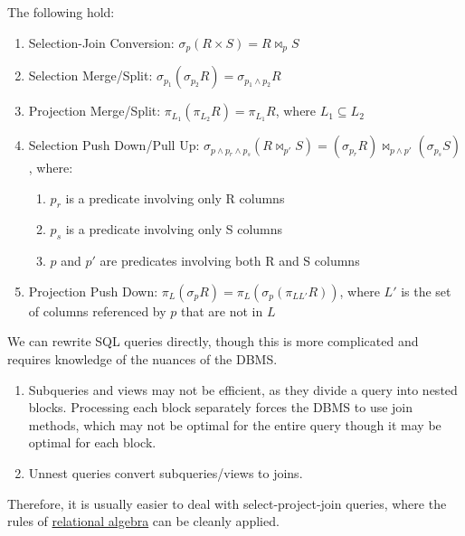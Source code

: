     \begin{theorem}[Identities]
      \label{thm:identities}
      The following hold:
      \begin{enumerate}
        \item Selection-Join Conversion: $\sigma_p(R \times S) = R \bowtie_p S$
        \item Selection Merge/Split: $\sigma_{p_1}(\sigma_{p_2}R) = \sigma_{p_1 \wedge p_2}R$
        \item Projection Merge/Split: $\pi_{L_1}(\pi_{L_2}R) = \pi_{L_1}R$, where $L_1 \subseteq L_2$
        \item Selection Push Down/Pull Up: $\sigma_{p \wedge p_r \wedge p_s}(R \bowtie_{p'} S) = (\sigma_{p_r}R) \bowtie_{p \wedge p'} (\sigma_{p_s}S)$, where:
          \begin{enumerate}
            \item $p_r$ is a predicate involving only R columns
            \item $p_s$ is a predicate involving only S columns
            \item $p$ and $p'$ are predicates involving both R and S columns
          \end{enumerate}
        \item Projection Push Down: $\pi_L(\sigma_p R) = \pi_L(\sigma_p(\pi_{L L'}R))$, where $L'$ is the set of columns referenced by $p$ that are not in $L$
      \end{enumerate}
    \end{theorem} 

    \begin{definition}
      \label{def:sql-query-rewrite}
      We can rewrite SQL queries directly, though this is more complicated and requires knowledge of the nuances of the DBMS. 
      \begin{enumerate}
        \item Subqueries and views may not be efficient, as they divide a query into nested blocks. Processing each block separately forces the DBMS to use join methods, which may not be optimal for the entire query though it may be optimal for each block. 
        \item Unnest queries convert subqueries/views to joins. 
      \end{enumerate}
      Therefore, it is usually easier to deal with select-project-join queries, where the rules of \hyperref[def:relational-algebra]{relational algebra} can be cleanly applied. 
    \end{definition} 

